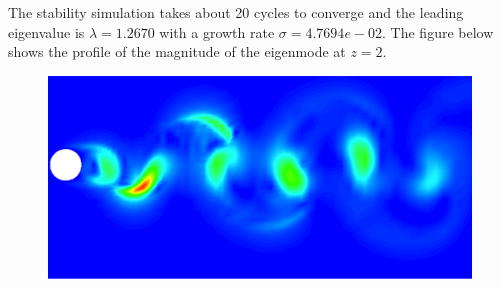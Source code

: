 The stability simulation takes about 20 cycles to converge and the leading eigenvalue is $\lambda=1.2670$ with a growth rate $\sigma=4.7694e-02$. The figure below shows the profile of the magnitude of the eigenmode at $z=2$.

\begin{figure}[!htbp]
\centering
 {\includegraphics[width=1 \textwidth]{img/floquet}}
   \caption {}
\end{figure}

